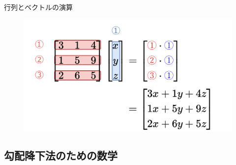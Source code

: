 \documentclass[dvipdfmx,aspectratio=169]{beamer}
\begin{document}
	\begin{frame}{行列とベクトルの演算}
		\begin{figure}
			\centering
			\includegraphics[width=0.6\linewidth]{img/product-of-matrix-and-vector}
		\end{figure}
		
	\end{frame}
	\subsection{勾配降下法のための数学}
\end{document}
